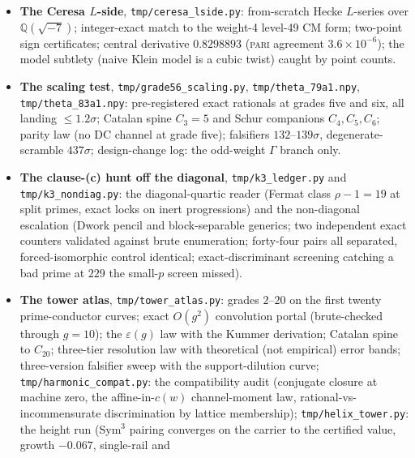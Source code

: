 \documentclass[11pt]{article}
\theoremstyle{definition}
\theoremstyle{remark}
\begin{document}
\begin{itemize}
phase cancellation, not conductor --- a third independent confirmation that
cheap descriptors carry no value information; the carrier-representation
identity holds at both grades), and the $\mathrm{Sym}^4$ escalation: $8/19$
oracle zeros located at degree five, the detected subset head-stable and
dying under both scrambles --- the locator's first degree-five focal events.
\item \textbf{The Ceresa $L$-side}, \texttt{tmp/ceresa\_lside.py}: from-scratch
Hecke $L$-series over $\mathbb Q(\sqrt{-7})$; integer-exact match to the
weight-4 level-49 CM form; two-point sign certificates; central derivative
$0.8298893$ (\textsc{pari} agreement $3.6\times10^{-6}$); the model subtlety
(naive Klein model is a cubic twist) caught by point counts.
\item \textbf{The scaling test}, \texttt{tmp/grade56\_scaling.py},
\texttt{tmp/theta\_79a1.npy}, \texttt{tmp/theta\_83a1.npy}: pre-registered
exact rationals at grades five and six, all landing $\le1.2\sigma$; Catalan
spine $C_3=5$ and Schur companions $C_4,C_5,C_6$; parity law (no DC channel at
grade five); falsifiers $132$--$139\sigma$, degenerate-scramble $437\sigma$;
design-change log: the odd-weight $\Gamma$ branch only.
\item \textbf{The clause-(c) hunt off the diagonal}, \texttt{tmp/k3\_ledger.py}
and \texttt{tmp/k3\_nondiag.py}: the diagonal-quartic reader (Fermat class
$\rho-1=19$ at split primes, exact locks on inert progressions) and the
non-diagonal escalation (Dwork pencil and block-separable generics; two
independent exact counters validated against brute enumeration; forty-four
pairs all separated, forced-isomorphic control identical; exact-discriminant
screening catching a bad prime at $229$ the small-$p$ screen missed).
\item \textbf{The tower atlas}, \texttt{tmp/tower\_atlas.py}: grades
$2$--$20$ on the first twenty prime-conductor curves; exact $O(g^2)$
convolution portal (brute-checked through $g=10$); the
$\varepsilon(g)$ law with the Kummer derivation; Catalan spine to $C_{20}$;
three-tier resolution law with theoretical (not empirical) error bands;
three-version falsifier sweep with the support-dilution curve;
\texttt{tmp/harmonic\_compat.py}: the compatibility audit (conjugate closure
at machine zero, the affine-in-$c(w)$ channel-moment law, rational-vs-%
incommensurate discrimination by lattice membership);
\texttt{tmp/helix\_tower.py}: the height run (Sym$^3$ pairing converges on
the carrier to the certified value, growth $-0.067$, single-rail and

\end{itemize}
\end{document}
